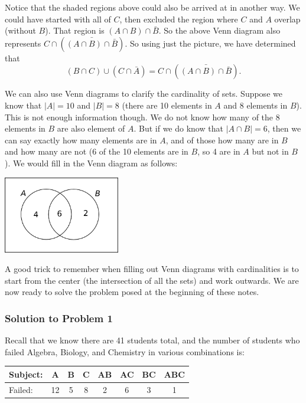 Notice that the shaded regions above could also be arrived at in another way.  We could have started with all of $C$, then excluded the region where $C$ and $A$ overlap (without $B$).  That region is $(A \cap B) \cap \bar B$.  So the above Venn diagram also represents $C \cap \left(\bar{(A\cap B)\cap \bar B}\right).$  So using just the picture, we have determined that
\[ (B \cap C) \cup (C \cap \bar A) = C \cap \left(\bar{(A\cap B)\cap \bar B}\right).\]


We can also use Venn diagrams to clarify the cardinality of sets.  Suppose we know that $|A| = 10$ and $|B| = 8$ (there are 10 elements in $A$ and 8 elements in $B$).  This is not enough information though.  We do not know how many of the 8 elements in $B$ are also element of $A$.  But if we do know that $|A \cap B| = 6$, then we can say exactly how many elements are in $A$, and of those how many are in $B$ and how many are not (6 of the 10 elements are in $B$, so 4 are in $A$ but not in $B$).  We would fill in the Venn diagram as follows:

\begin{center}
 \includegraphics[width=2in]{pictures/venn2card.png}
\end{center}

A good trick to remember when filling out Venn diagrams with cardinalities is to start from the center (the intersection of all the sets) and work outwards.  We are now ready to solve the problem posed at the beginning of these notes.

\subsubsection*{Solution to Problem 1}

Recall that we know there are 41 students total, and the number of students who failed Algebra, Biology, and Chemistry in various combinations is: 

\begin{center}
\begin{tabular}{|l|c|c|c|c|c|c|c|}
\hline
 Subject: & A & B & C & AB & AC & BC & ABC\\
\hline
Failed: & 12 & 5 & 8 & 2 & 6 & 3 & 1\\
\hline
\end{tabular}
\end{center}

